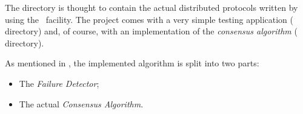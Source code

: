 The  directory is thought to contain the actual
distributed protocols written by using the \YUNA\ facility. The project
comes with a very simple testing application (
directory) and, of course, with an implementation of the \emph{consensus
algorithm} ( directory).

As mentioned in , the implemented
algorithm is split into two parts:
\begin{itemize}

    \item   The \emph{Failure Detector};
    \item   The actual \emph{Consensus Algorithm}.

\end{itemize}

